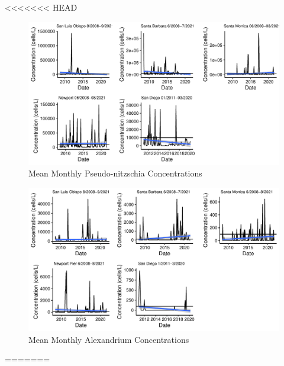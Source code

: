 \documentclass[
  12pt,
]{article}
\begin{document}
<<<<<<< HEAD
\begin{figure}
\centering
\includegraphics{Habs_Final_Report_files/figure-latex/combining Pseudo-nitzschia figures-1.pdf}
\caption{Mean Monthly Pseudo-nitzschia Concentrations}
\end{figure}

\begin{figure}
\centering
\includegraphics{Habs_Final_Report_files/figure-latex/combining Alexandrium figures-1.pdf}
\caption{Mean Monthly Alexandrium Concentrations}
\end{figure}
=======
\newpage
\end{document}
